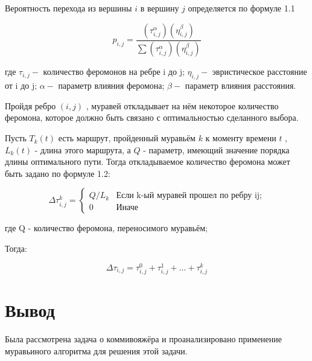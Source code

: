 Вероятность перехода из вершины $i$ в вершину $j$ определяется по формуле 1.1 

\begin{equation}
p_{i,j}={\frac {(\tau_{i,j}^{\alpha })(\eta_{i,j}^{\beta })}{\sum (\tau_{i,j}^{\alpha})(\eta_{i,j}^{\beta })}}
\end{equation}

где  $ \tau_{i,j} - $ количество феромонов на ребре i до j;
$\eta_{i,j} - $ эвристическое расстояние от i до j;
$\alpha - $ параметр влияния феромона;
$\beta - $ параметр влияния расстояния.

Пройдя ребро $(i,j)$ , муравей откладывает на нём некоторое количество феромона, которое должно быть связано с оптимальностью сделанного выбора. 

Пусть $T _{k} (t)$ есть маршрут, пройденный муравьём $k$ к моменту времени $t$ , $L _{k} (t)$ - длина этого маршрута, а $Q$ - параметр, имеющий значение порядка длины оптимального пути.
Тогда откладываемое количество феромона может быть задано по формуле 1.2:

\begin{equation}
{\displaystyle \Delta \tau _{i,j}^k={\begin{cases}Q/L_{k}& {\mbox{Если k-ый муравей прошел по ребру ij;}}\\0&{\mbox{Иначе}}\end{cases}}}
\end{equation}

где Q - количество феромона, переносимого муравьём;


Тогда:

\begin{equation}
\Delta \tau _{i,j}= \tau _{i,j}^0 + \tau _{i,j}^1 + ... + \tau _{i,j}^k
\end{equation}

\section{Вывод}
Была рассмотрена задача о коммивояжёра и проанализировано применение муравьиного алгоритма для решения этой задачи.